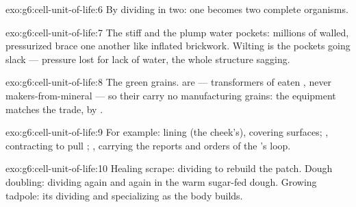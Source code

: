 \begin{solution}{exo:g6:cell-unit-of-life:6}
By dividing in two: one  becomes two complete
organisms.
\end{solution}

\begin{solution}{exo:g6:cell-unit-of-life:7}
The stiff  and the plump water pockets: millions
of walled, pressurized  brace one another like
inflated brickwork. Wilting is the pockets going slack ---
pressure lost for lack of water, the whole structure
sagging.
\end{solution}

\begin{solution}{exo:g6:cell-unit-of-life:8}
The green grains.  are  --- transformers of
eaten , never makers-from-mineral --- so
their  carry no manufacturing grains: the equipment
matches the trade,  by .
\end{solution}

\begin{solution}{exo:g6:cell-unit-of-life:9}
For example: lining  (the cheek's), covering surfaces;
 , contracting to pull ;  ,
carrying the reports and orders of the 's loop.
\end{solution}

\begin{solution}{exo:g6:cell-unit-of-life:10}
Healing scrape:   dividing to rebuild the patch.
Dough doubling:   dividing again and again in the
warm sugar-fed dough. Growing tadpole: its  dividing
and specializing as the body builds.
\end{solution}

